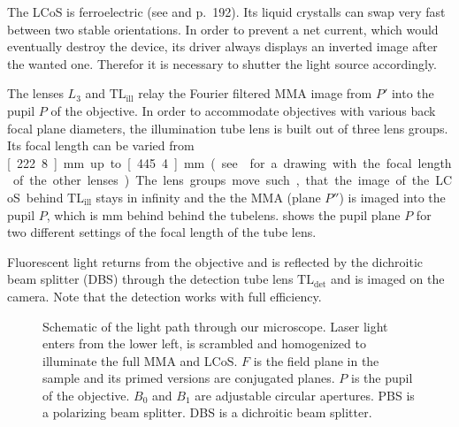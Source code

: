 The LCoS is ferroelectric (see \cite{1991Saleh} and \cite{Goodman1996}
p.~192).  Its liquid crystalls can swap very fast between two stable
orientations. In order to prevent a net current, which would
eventually destroy the device, its driver always displays an inverted
image after the wanted one. Therefor it is necessary to shutter the
light source accordingly.

The lenses $L_3$ and $\textrm{TL}_\textrm{ill}$ relay the Fourier
filtered MMA image from $P'$ into the pupil $P$ of the objective. In
order to accommodate objectives with various back focal plane
diameters, the illumination tube lens is built out of three lens
groups. Its focal length can be varied from \unit[222.8]{mm} up to
\unit[445.4]{mm} (see  for a drawing with the
focal length of the other lenses). The lens groups move such, that the
image of the LCoS behind $\textrm{TL}_\textrm{ill}$ stays in infinity
and the the MMA (plane $P''$) is imaged into the pupil $P$, which is
\unit[250]{mm} behind behind the tubelens. 
shows the pupil plane $P$ for two different settings of the focal
length of the tube lens.

Fluorescent light returns from the objective and is reflected by the
dichroitic beam splitter (DBS) through the detection tube lens
$\textrm{TL}_\textrm{det}$ and is imaged on the camera. Note that the
detection works with full efficiency.

\begin{figure}[!hbt]
  \centering
  \def\svgscale{2}
  
  \caption{Schematic of the light path through our microscope. Laser
    light enters from the lower left, is scrambled and homogenized to
    illuminate the full MMA and LCoS. $F$ is the field plane in the
    sample and its primed versions are conjugated planes. $P$ is the
    pupil of the objective. $B_0$ and $B_1$ are adjustable circular
    apertures. PBS is a polarizing beam splitter. DBS is a dichroitic
    beam splitter.}
  \label{fig:memi-real}
\end{figure}




